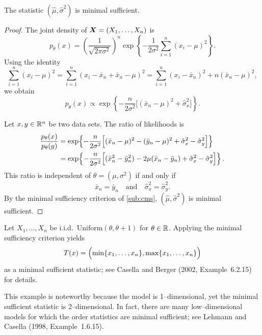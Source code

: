 \begin{claim}
The statistic $(\hat{\mu},\hat{\sigma}^2)$ is minimal sufficient.
\end{claim}

\begin{proof}
The joint density of $\boldsymbol{X}=(X_1,\dots,X_n)$ is
\[
p_{\theta}(x)
=
\left( \frac{1}{\sqrt{2\pi\sigma^2}} \right)^n
\exp\!\left\{
-\frac{1}{2\sigma^2}\sum_{i=1}^n (x_i-\mu)^2
\right\}.
\]
Using the identity
\[
       \sum\limits_{i=1}^{n} (x_{i}-\mu)^2
       = \sum\limits_{i=1}^{n} (x_{i} - \bar{x}_{n}+\bar{x}_{n}-\mu)^2
       = \sum\limits_{i=1}^{n} (x_{i}-\bar{x}_{n})^2 + n(\bar{x}_{n}-\mu)^2,
\]
we obtain
\[
p_{\theta}(x)
\propto
\exp\!\left\{
-\frac{n}{2\sigma^2}
\bigl[(\bar{x}_n-\mu)^2 + \hat{\sigma}^2_x\bigr]
\right\}.
\]

Let $x,y \in \mathbb{R}^n$ be two data sets. The ratio of likelihoods is
\begin{align*}
\frac{p_{\theta}(x)}{p_{\theta}(y)}
&=
\exp\!\left\{
-\frac{n}{2\sigma^2}
\Bigl[
(\bar{x}_n-\mu)^2 - (\bar{y}_n-\mu)^2
+ \hat{\sigma}^2_x - \hat{\sigma}^2_y
\Bigr]
\right\} \\
&=
\exp\!\left\{
-\frac{n}{2\sigma^2}
\Bigl[
(\bar{x}_n^2-\bar{y}_n^2)
-2\mu(\bar{x}_n-\bar{y}_n)
+ \hat{\sigma}^2_x - \hat{\sigma}^2_y
\Bigr]
\right\}.
\end{align*}
This ratio is independent of $\theta=(\mu,\sigma^2)$ if and only if
\[
\bar{x}_n = \bar{y}_n
\quad\text{and}\quad
\hat{\sigma}^2_x = \hat{\sigma}^2_y .
\]
By the minimal sufficiency criterion of \autoref{sub:cms},
$(\hat{\mu},\hat{\sigma}^2)$ is minimal sufficient.
\end{proof}

\begin{ex}
Let $X_1,\dots,X_n$ be i.i.d.\ $\mathrm{Uniform}(\theta,\theta+1)$ for $\theta \in \mathbb{R}$.
Applying the minimal sufficiency criterion yields
\[
T(x) =
\Bigl(
\min\{x_1,\dots,x_n\},
\max\{x_1,\dots,x_n\}
\Bigr)
\]
as a minimal sufficient statistic; see Casella and Berger (2002,
Example~6.2.15) for details.

This example is noteworthy because the model is 1--dimensional,
yet the minimal sufficient statistic is 2--dimensional.
In fact, there are many low--dimensional models for which the order
statistics are minimal sufficient; see Lehmann and Casella (1998,
Example~1.6.15).
\end{ex}
